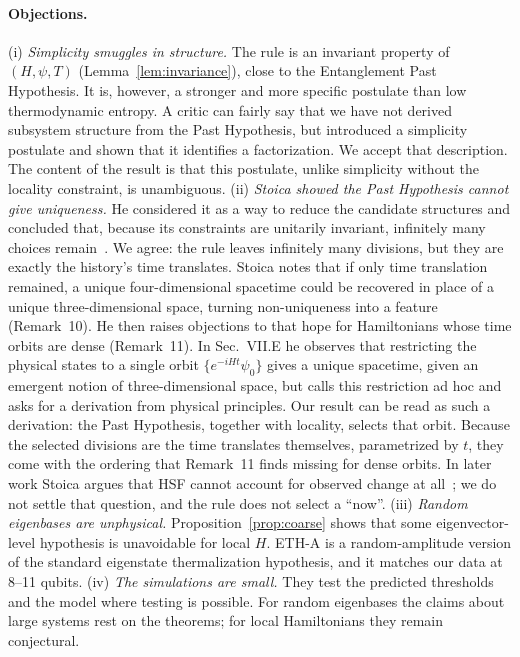 \documentclass[11pt]{article}
\theoremstyle{definition}
\theoremstyle{remark}
\begin{document}
\paragraph{Objections.} (i) \emph{Simplicity smuggles in structure.} The rule is an invariant property of $(H,\psi,T)$ (Lemma~\ref{lem:invariance}), close to the Entanglement Past Hypothesis. It is, however, a stronger and more specific postulate than low thermodynamic entropy. A critic can fairly say that we have not derived subsystem structure from the Past Hypothesis, but introduced a simplicity postulate and shown that it identifies a factorization. We accept that description. The content of the result is that this postulate, unlike simplicity without the locality constraint, is unambiguous. (ii) \emph{Stoica showed the Past Hypothesis cannot give uniqueness.} He considered it as a way to reduce the candidate structures and concluded that, because its constraints are unitarily invariant, infinitely many choices remain~\cite[Sec.~VII.B]{Stoica2022}. We agree: the rule leaves infinitely many divisions, but they are exactly the history's time translates. Stoica notes that if only time translation remained, a unique four-dimensional spacetime could be recovered in place of a unique three-dimensional space, turning non-uniqueness into a feature (Remark~10). He then raises objections to that hope for Hamiltonians whose time orbits are dense (Remark~11). In Sec.~VII.E he observes that restricting the physical states to a single orbit $\{e^{-iHt}\psi_0\}$ gives a unique spacetime, given an emergent notion of three-dimensional space, but calls this restriction ad hoc and asks for a derivation from physical principles. Our result can be read as such a derivation: the Past Hypothesis, together with locality, selects that orbit. Because the selected divisions are the time translates themselves, parametrized by $t$, they come with the ordering that Remark~11 finds missing for dense orbits. In later work Stoica argues that HSF cannot account for observed change at all~\cite{Stoica2026}; we do not settle that question, and the rule does not select a ``now''. (iii) \emph{Random eigenbases are unphysical.} Proposition~\ref{prop:coarse} shows that some eigenvector-level hypothesis is unavoidable for local $H$. ETH-A is a random-amplitude version of the standard eigenstate thermalization hypothesis, and it matches our data at 8--11 qubits. (iv) \emph{The simulations are small.} They test the predicted thresholds and the model where testing is possible. For random eigenbases the claims about large systems rest on the theorems; for local Hamiltonians they remain conjectural.
\end{document}
